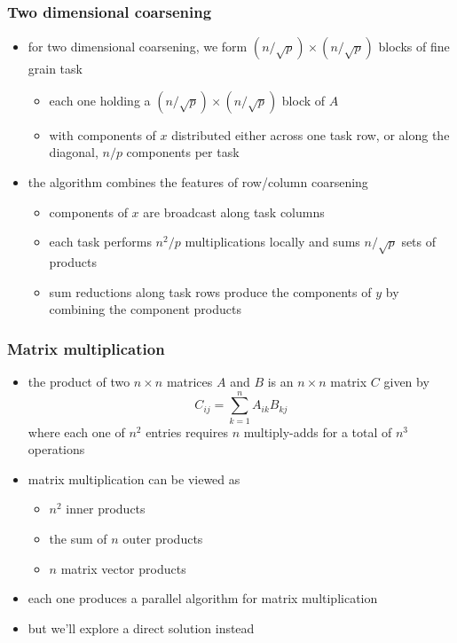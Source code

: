 \begin{frame}[fragile]
%
  \frametitle{Two dimensional coarsening}
%
  \begin{itemize}
%
  \item for two dimensional coarsening, we form $(n/\sqrt{p}) \times (n/\sqrt{p})$ blocks of
    fine grain task
    \begin{itemize}
    \item each one holding a $(n/\sqrt{p}) \times (n/\sqrt{p})$ block of $A$
    \item with components of $x$ distributed either across one task row, or along the diagonal,
      $n/p$ components per task
    \end{itemize}
%
  \item the algorithm combines the features of row/column coarsening
    \begin{itemize}
    \item components of $x$ are broadcast along task columns
    \item each task performs $n^{2}/p$ multiplications locally and sums $n/\sqrt{p}$ sets of
      products
      \item sum reductions along task rows produce the components of $y$ by combining the
        component products
    \end{itemize}
%
  \end{itemize}
%
\end{frame}

\begin{frame}[fragile]
%
  \frametitle{Matrix multiplication}
%
  \begin{itemize}
%
  \item the product of two $n \times n$ matrices $A$ and $B$ is an $n \times n$ matrix $C$
    given by
    \begin{equation}
      C_{ij} = \sum_{k=1}^{n} A_{ik} B_{kj}
    \end{equation}
    where each one of $n^{2}$ entries requires $n$ multiply-adds for a total of $n^{3}$
    operations
%
  \item matrix multiplication can be viewed as
    \begin{itemize}
    \item $n^{2}$ inner products
    \item the sum of $n$ outer products
    \item $n$ matrix vector products
    \end{itemize}
%
  \item each one produces a parallel algorithm for matrix multiplication
%
  \item but we'll explore a direct solution instead
%
  \end{itemize}
%
\end{frame}

